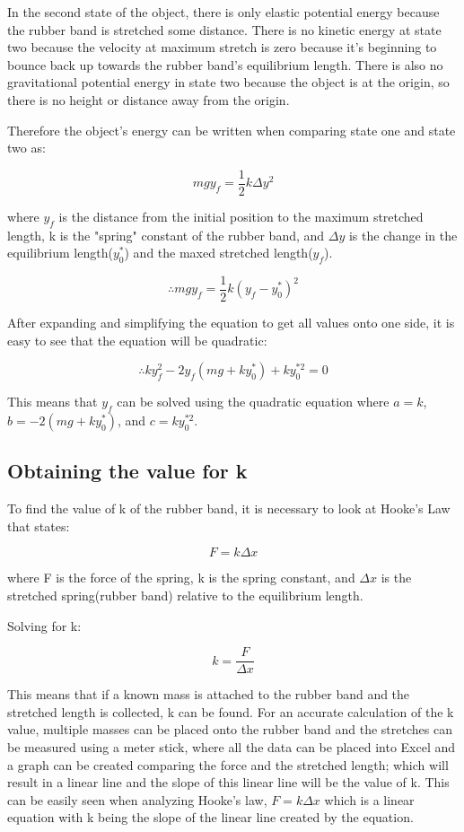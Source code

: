 \documentclass[aps,letterpaper,11pt]{revtex4}
\begin{document}
In the second state of the object, there is only elastic potential energy because the rubber band is stretched some distance. There is no kinetic energy at state two because the velocity at maximum stretch is zero because it's beginning to bounce back up towards the rubber band's equilibrium length. There is also no gravitational potential energy in state two because the object is at the origin, so there is no height or distance away from the origin. 

Therefore the object's energy can be written when comparing state one and state two as:

$$ mgy_f= \frac{1}{2}k \Delta y^2$$

where $y_f$ is the distance from the initial position to the maximum stretched length, k is the "spring" constant of the rubber band, and $\Delta y$ is the change in the equilibrium length($y_0^*$) and the maxed stretched length($y_f$).

$$ \therefore mgy_f= \frac{1}{2}k(y_f - y_0^*)^2$$

After expanding and simplifying the equation to get all values onto one side, it is easy to see that the equation will be quadratic:

$$ \therefore ky_f^2-2y_f(mg+ky_0^*) + ky_0^{*2} = 0$$

This means that $y_f$ can be solved using the quadratic equation where $a = k$, $b=-2(mg+ky_0^*)$, and $c=ky_0^{*2}$.

\subsection{Obtaining the value for k}

To find the value of k of the rubber band, it is necessary to look at Hooke's Law that states:

$$ F=k \Delta x$$

where F is the force of the spring, k is the spring constant, and $\Delta x$ is the stretched spring(rubber band) relative to the equilibrium length.

Solving for k:

$$ k = \frac{F}{\Delta x}$$

This means that if a known mass is attached to the rubber band and the stretched length is collected, k can be found. For an accurate calculation of the k value, multiple masses can be placed onto the rubber band and the stretches can be measured using a meter stick, where all the data can be placed into Excel and a graph can be created comparing the force and the stretched length; which will result in a linear line and the slope of this linear line will be the value of k. This can be easily seen when analyzing Hooke's law, $F=k \Delta x$ which is a linear equation with k being the slope of the linear line created by the equation.
\end{document}
